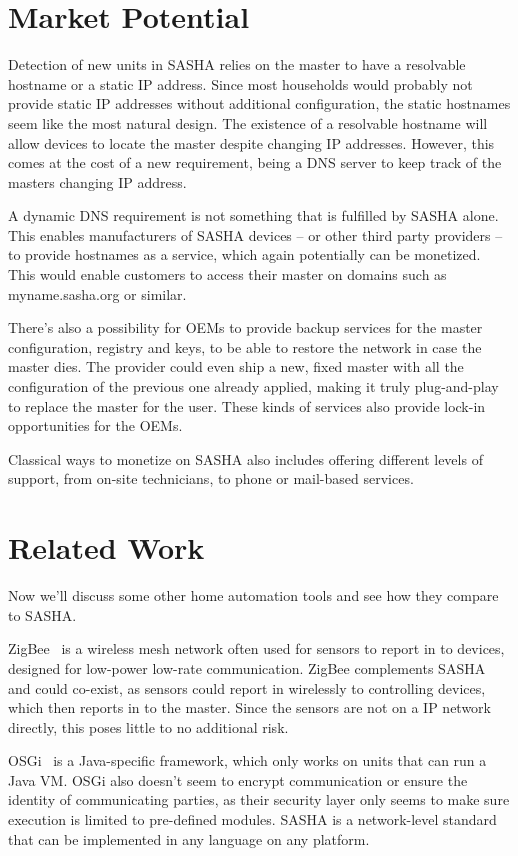 \section{Market Potential}
Detection of new units in SASHA relies on the master to have a resolvable hostname or a static IP address. Since most households would probably not provide static IP addresses without additional configuration, the static hostnames seem like the most natural design.
The existence of a resolvable hostname will allow devices to locate the master despite changing IP addresses. However, this comes at the cost of a new requirement, being a DNS server to keep track of the masters changing IP address.

A dynamic DNS requirement is not something that is fulfilled by SASHA alone. This enables manufacturers of SASHA devices -- or other third party providers -- to provide hostnames as a service, which again potentially can be monetized. This would enable customers to access their master on domains such as myname.sasha.org or similar.

There's also a possibility for OEMs to provide backup services for the master configuration, registry and keys, to be able to restore the network in case the master dies. The provider could even ship a new, fixed master with all the configuration of the previous one already applied, making it truly plug-and-play to replace the master for the user. These kinds of services also provide lock-in opportunities for the OEMs.

Classical ways to monetize on SASHA also includes offering different levels of support, from on-site technicians, to phone or mail-based services.

\section{Related Work}

Now we'll discuss some other home automation tools and see how they compare to SASHA.

ZigBee~\cite{zigbee} is a wireless mesh network often used for sensors to report in to devices, designed for low-power low-rate communication. ZigBee complements SASHA and could co-exist, as sensors could report in wirelessly to controlling devices, which then reports in to the master. Since the sensors are not on a IP network directly, this poses little to no additional risk.

OSGi~\cite{osgi} is a Java-specific framework, which only works on units that can run a Java VM. OSGi also doesn't seem to encrypt communication or ensure the identity of communicating parties, as their security layer only seems to make sure execution is limited to pre-defined modules. SASHA is a network-level standard that can be implemented in any language on any platform.

